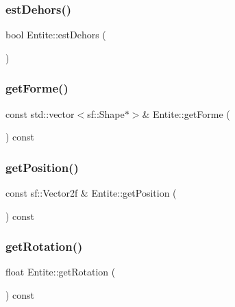 \mbox{\label{class_entite_a4d38790ebb4bf082e20e47355a7b2f0c}} 
\subsubsection{\texorpdfstring{est\+Dehors()}{estDehors()}}
{\footnotesize\ttfamily bool Entite\+::est\+Dehors (\begin{DoxyParamCaption}{ }\end{DoxyParamCaption})}

\mbox{\label{class_entite_a0fccfa39c6be09c5ea63fb999fef4c8e}} 
\subsubsection{\texorpdfstring{get\+Forme()}{getForme()}}
{\footnotesize\ttfamily const std\+::vector$<$sf\+::\+Shape$\ast$$>$\& Entite\+::get\+Forme (\begin{DoxyParamCaption}{ }\end{DoxyParamCaption}) const\hspace{0.3cm}{\ttfamily [inline]}}

\mbox{\label{class_entite_a958fc8d1cfb3b91c6cadd615dbb2abbd}} 
\subsubsection{\texorpdfstring{get\+Position()}{getPosition()}}
{\footnotesize\ttfamily const sf\+::\+Vector2f \& Entite\+::get\+Position (\begin{DoxyParamCaption}{ }\end{DoxyParamCaption}) const}

\mbox{\label{class_entite_af245a50c73da19510d9a9e52cb9248a4}} 
\subsubsection{\texorpdfstring{get\+Rotation()}{getRotation()}}
{\footnotesize\ttfamily float Entite\+::get\+Rotation (\begin{DoxyParamCaption}{ }\end{DoxyParamCaption}) const}

